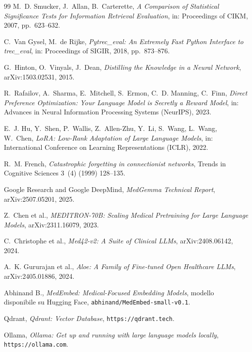 \documentclass[pdflatex,sn-mathphys-num]{sn-jnl}
\theoremstyle{thmstyleone}
\theoremstyle{thmstyletwo}
\theoremstyle{thmstylethree}
\begin{document}
\begin{thebibliography}{99}
M.~D. Smucker, J.~Allan, B.~Carterette,
\emph{A Comparison of Statistical Significance Tests for Information Retrieval Evaluation},
in: Proceedings of CIKM, 2007, pp.~623--632.

C.~Van Gysel, M.~de Rijke,
\emph{Pytrec\_eval: An Extremely Fast Python Interface to trec\_eval},
in: Proceedings of SIGIR, 2018, pp.~873--876.

G.~Hinton, O.~Vinyals, J.~Dean,
\emph{Distilling the Knowledge in a Neural Network},
arXiv:1503.02531, 2015.

R.~Rafailov, A.~Sharma, E.~Mitchell, S.~Ermon, C.~D. Manning, C.~Finn,
\emph{Direct Preference Optimization: Your Language Model is Secretly a Reward Model},
in: Advances in Neural Information Processing Systems (NeurIPS), 2023.

E.~J. Hu, Y.~Shen, P.~Wallis, Z.~Allen-Zhu, Y.~Li, S.~Wang, L.~Wang, W.~Chen,
\emph{LoRA: Low-Rank Adaptation of Large Language Models},
in: International Conference on Learning Representations (ICLR), 2022.

R.~M. French,
\emph{Catastrophic forgetting in connectionist networks},
Trends in Cognitive Sciences 3~(4) (1999) 128--135.

Google Research and Google DeepMind,
\emph{MedGemma Technical Report},
arXiv:2507.05201, 2025.

Z.~Chen et al.,
\emph{MEDITRON-70B: Scaling Medical Pretraining for Large Language Models},
arXiv:2311.16079, 2023.

C.~Christophe et al.,
\emph{Med42-v2: A Suite of Clinical LLMs},
arXiv:2408.06142, 2024.

A.~K. Gururajan et al.,
\emph{Aloe: A Family of Fine-tuned Open Healthcare LLMs},
arXiv:2405.01886, 2024.

Abhinand B.,
\emph{MedEmbed: Medical-Focused Embedding Models},
modello disponibile su Hugging Face, \texttt{abhinand/MedEmbed-small-v0.1}.

Qdrant,
\emph{Qdrant: Vector Database},
\texttt{https://qdrant.tech}.

Ollama,
\emph{Ollama: Get up and running with large language models locally},
\texttt{https://ollama.com}.

\end{thebibliography}
\end{document}
